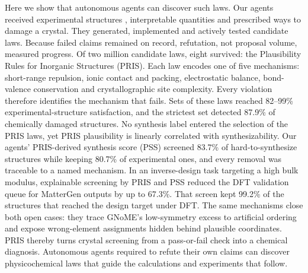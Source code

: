 Here we show that autonomous agents can discover such laws. Our agents received experimental
structures \cite{zagorac2019recent,grazulis2009crystallography}, interpretable quantities
and prescribed ways to damage a crystal. They generated, implemented and actively tested
candidate laws. Because failed claims remained on record, refutation, not proposal
volume, measured progress. Of two million candidate laws, eight survived: the Plausibility Rules
for Inorganic Structures (PRIS). Each law encodes one of five mechanisms: short-range
repulsion, ionic contact and packing, electrostatic balance, bond-valence conservation and
crystallographic site complexity. Every violation therefore identifies the mechanism that
fails. Sets of these laws reached 82--99\% experimental-structure satisfaction, and the
strictest set detected 87.9\% of chemically damaged structures.
No synthesis label entered the selection of the PRIS laws, yet PRIS plausibility is
linearly correlated with synthesizability. Our agents' PRIS-derived synthesis score (PSS)
screened 83.7\% of hard-to-synthesize structures while keeping 80.7\% of experimental ones,
and every removal was traceable to a named mechanism. In an inverse-design task targeting a
high bulk modulus, explainable screening by PRIS and PSS reduced the DFT validation queue for
MatterGen outputs by up to 67.3\%. That screen kept 99.2\% of the
structures that reached the design target under DFT. The same mechanisms close both open cases: they trace GNoME's low-symmetry excess to
artificial ordering and expose wrong-element assignments hidden behind plausible coordinates. PRIS thereby turns crystal screening from a
pass-or-fail check into a chemical diagnosis. Autonomous agents required to refute their own claims can discover physicochemical laws
that guide the calculations and experiments that follow.

